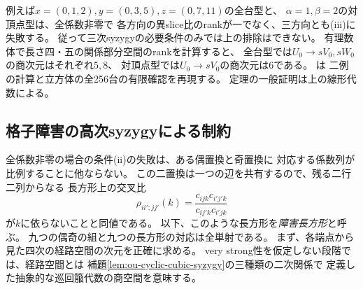 \begin{remark}
\label{rem:ou-dense-higher-syzygy-examples}
例えば$x=(0,1,2),y=(0,3,5),z=(0,7,11)$の全台型と、
$\alpha=1,\beta=2$の対頂点型は、全係数非零で
各方向の異slice比のrankが一でなく、三方向とも(iii)に失敗する。
従って三次syzygyの必要条件のみでは上の排除はできない。
有理数体で長さ四・五の関係部分空間のrankを計算すると、
全台型では$U_0\to sV_0,sW_0$の商次元はそれぞれ$5,8$、
対頂点型では$U_0\to sV_0$の商次元は$6$である。
 は
二例の計算と立方体の全256台の有限確認を再現する。
定理の一般証明は上の線形代数による。
\end{remark}

\subsection{格子障害の高次syzygyによる制約}
\label{subsec:ou-grid-higher-syzygies}

全係数非零の場合の条件(ii)の失敗は、ある偶置換と奇置換に
対応する係数列が比例することに他ならない。
この二置換は一つの辺を共有するので、残る二行二列からなる
長方形上の交叉比
\[
 \rho_{ii';jj'}(k)=\frac{c_{ijk}c_{i'j'k}}{c_{ij'k}c_{i'jk}}
\]
が$k$に依らないことと同値である。
以下、このような長方形を\emph{障害長方形}と呼ぶ。
九つの偶奇の組と九つの長方形の対応は全単射である。
まず、各端点から見た四次の経路空間の次元を正確に求める。
very strong性を仮定しない段階では、経路空間とは
補題\ref{lem:ou-cyclic-cubic-syzygy}の三種類の二次関係で
定義した抽象的な巡回箙代数の商空間を意味する。

